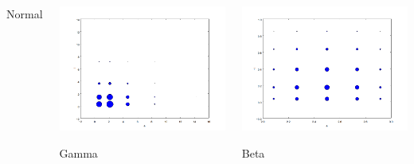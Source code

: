 \documentclass{beamer}
\begin{document}
\begin{frame}
\begin{columns}
\begin{center}
                Normal
     \end{center}
     \begin{center}
                \includegraphics[width=.7\textwidth]{nodes_gamma.png}

                Gamma
     \end{center}

     \begin{center}
                \includegraphics[width=.7\textwidth]{nodes_beta.png}

                Beta
     \end{center}
 \end{columns}
\end{frame}


%
\end{document}
